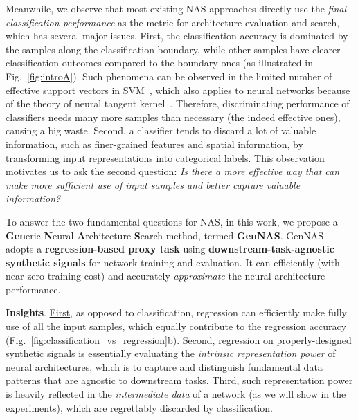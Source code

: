 \documentclass{article}
\begin{document}
Meanwhile, we observe that most existing NAS approaches directly use the \textit{final classification performance} as the metric for architecture evaluation and search, which has several major issues. First, the classification accuracy is dominated by the samples along the classification boundary, while other samples have clearer classification outcomes compared to the boundary ones (as illustrated in Fig.~\ref{fig:introA}). Such phenomena can be observed in the limited number of effective support vectors in SVM~\cite{hearst1998support}, which also applies to neural networks because of the theory of neural tangent kernel~\cite{jacot2018neural}.
Therefore, discriminating performance of classifiers needs many more samples than necessary (the indeed effective ones), causing a big waste.
Second, a classifier tends to discard a lot of valuable information, such as finer-grained features and spatial information, by transforming input representations into categorical labels.
This observation motivates us to ask the second question: \textit{Is there a more effective way that can make more sufficient use of input samples and better capture valuable information?}

To answer the two fundamental questions for NAS, in this work, we propose a \textbf{Gen}eric \textbf{N}eural \textbf{A}rchitecture \textbf{S}earch method, termed \textbf{GenNAS}. GenNAS adopts a \textbf{regression-based proxy task} using \textbf{downstream-task-agnostic synthetic signals} for network training and evaluation. It can efficiently (with near-zero training cost) and accurately \textit{approximate} the neural architecture performance. 

\textbf{Insights}.
\underline{First}, as opposed to classification, regression can efficiently make fully use of all the input samples, which equally contribute to the regression accuracy (Fig.~\ref{fig:classification_vs_regression}b). 
\underline{Second}, regression on properly-designed synthetic signals is essentially evaluating the \textit{intrinsic representation power} of neural architectures, which is to capture and distinguish fundamental data patterns that are agnostic to downstream tasks. 
\underline{Third}, such representation power is heavily reflected in the \textit{intermediate data} of a network (as we will show in the experiments), which are regrettably discarded by classification.
\end{document}
